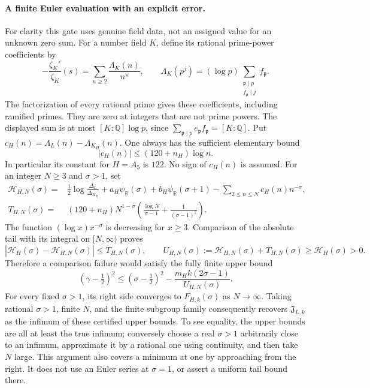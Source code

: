 \paragraph{A finite Euler evaluation with an explicit error.}
For clarity this gate uses genuine field data,
not an assigned value for an unknown zero sum.
For a number field \(K\), define its rational
prime-power coefficients by
\[
 -\frac{\zeta_K'}{\zeta_K}(s)
       =\sum_{n\ge2}\frac{\Lambda_K(n)}{n^s},
 \qquad
 \Lambda_K(p^j)
       =(\log p)\sum_{\substack{\mathfrak p\mid p\\
                               f_{\mathfrak p}\mid j}}
                                     f_{\mathfrak p}.
 \tag{MA-RB.195}
\]
The factorization of every rational prime gives
these coefficients, including ramified primes.
They are zero at integers that are not prime powers.
The displayed sum is at most \([K:\mathbb Q]\log p\),
since \(\sum_{\mathfrak p\mid p}e_{\mathfrak p}
 f_{\mathfrak p}=[K:\mathbb Q]\).
Put \(c_H(n)=\Lambda_L(n)-\Lambda_{K_H}(n)\).
One always has the sufficient elementary bound
\[
              |c_H(n)|\le(120+n_H)\log n .
 \tag{MA-RB.196}
\]
In particular its constant for \(H=A_5\) is
\(122\). No sign of \(c_H(n)\) is assumed.
For an integer \(N\ge3\) and \(\sigma>1\), set
\[
 \begin{split}
 \mathscr H_{H,N}(\sigma)
    ={}&\frac12\log\frac{\Delta_L}{\Delta_{K_H}}
       +a_H\psi_{\mathbb R}(\sigma)
       +b_H\psi_{\mathbb R}(\sigma+1)
       -\sum_{2\le n\le N}c_H(n)n^{-\sigma},\\
 T_{H,N}(\sigma)
    ={}&(120+n_H)N^{1-\sigma}
       \left(\frac{\log N}{\sigma-1}
                         +\frac1{(\sigma-1)^2}\right).
 \end{split}
 \tag{MA-RB.197}
\]
The function \((\log x)x^{-\sigma}\) is decreasing
for \(x\ge3\). Comparison of the absolute tail
with its integral on \([N,\infty)\) proves
\[
 \left|\mathscr H_H(\sigma)-\mathscr H_{H,N}(\sigma)\right|
             \le T_{H,N}(\sigma),\qquad
 U_{H,N}(\sigma):=\mathscr H_{H,N}(\sigma)+T_{H,N}(\sigma)
                    \ge\mathscr H_H(\sigma)>0.
 \tag{MA-RB.198}
\]
Therefore a comparison failure would satisfy
the fully finite upper bound
\[
 (\gamma-\tfrac12)^2
      \le(\sigma-\tfrac12)^2
               -\frac{m_Hk(2\sigma-1)}{U_{H,N}(\sigma)}.
 \tag{MA-RB.199}
\]
For every fixed \(\sigma>1\), its right side
converges to \(F_{H,k}(\sigma)\) as \(N\to\infty\).
Taking rational \(\sigma>1\), finite \(N\), and
the finite subgroup family consequently recovers
\(\mathfrak J_{L,k}\) as the infimum of these
certified upper bounds. To see equality, the
upper bounds are all at least the true infimum;
conversely choose a real \(\sigma>1\) arbitrarily
close to an infimum, approximate it by a rational
one using continuity, and then take \(N\) large.
This argument also covers a minimum at one by
approaching from the right. It does not use an
Euler series at \(\sigma=1\), or assert a uniform
tail bound there.

